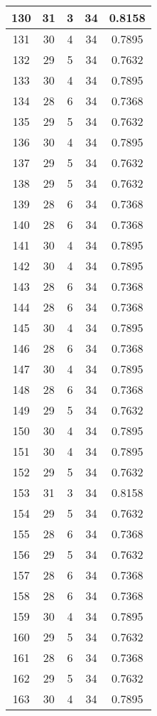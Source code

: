 \documentclass[letterpaper, 12pt]{article}
\begin{document}
\begin{longtable}{|c|c|c|c|c|}
\hline
130 & 31 & 3 & 34 & 0.8158 \\
\hline
131 & 30 & 4 & 34 & 0.7895 \\
\hline
132 & 29 & 5 & 34 & 0.7632 \\
\hline
133 & 30 & 4 & 34 & 0.7895 \\
\hline
134 & 28 & 6 & 34 & 0.7368 \\
\hline
135 & 29 & 5 & 34 & 0.7632 \\
\hline
136 & 30 & 4 & 34 & 0.7895 \\
\hline
137 & 29 & 5 & 34 & 0.7632 \\
\hline
138 & 29 & 5 & 34 & 0.7632 \\
\hline
139 & 28 & 6 & 34 & 0.7368 \\
\hline
140 & 28 & 6 & 34 & 0.7368 \\
\hline
141 & 30 & 4 & 34 & 0.7895 \\
\hline
142 & 30 & 4 & 34 & 0.7895 \\
\hline
143 & 28 & 6 & 34 & 0.7368 \\
\hline
144 & 28 & 6 & 34 & 0.7368 \\
\hline
145 & 30 & 4 & 34 & 0.7895 \\
\hline
146 & 28 & 6 & 34 & 0.7368 \\
\hline
147 & 30 & 4 & 34 & 0.7895 \\
\hline
148 & 28 & 6 & 34 & 0.7368 \\
\hline
149 & 29 & 5 & 34 & 0.7632 \\
\hline
150 & 30 & 4 & 34 & 0.7895 \\
\hline
151 & 30 & 4 & 34 & 0.7895 \\
\hline
152 & 29 & 5 & 34 & 0.7632 \\
\hline
153 & 31 & 3 & 34 & 0.8158 \\
\hline
154 & 29 & 5 & 34 & 0.7632 \\
\hline
155 & 28 & 6 & 34 & 0.7368 \\
\hline
156 & 29 & 5 & 34 & 0.7632 \\
\hline
157 & 28 & 6 & 34 & 0.7368 \\
\hline
158 & 28 & 6 & 34 & 0.7368 \\
\hline
159 & 30 & 4 & 34 & 0.7895 \\
\hline
160 & 29 & 5 & 34 & 0.7632 \\
\hline
161 & 28 & 6 & 34 & 0.7368 \\
\hline
162 & 29 & 5 & 34 & 0.7632 \\
\hline
163 & 30 & 4 & 34 & 0.7895 \\

\end{longtable}
\end{document}
